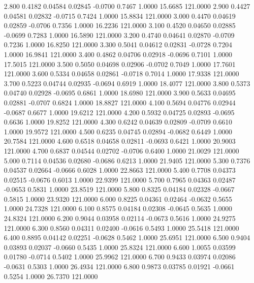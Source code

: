    2.800   0.4182   0.04584   0.02845  -0.0700   0.7467   1.0000  15.6685 121.0000
   2.900   0.4427   0.04581   0.02832  -0.0715   0.7424   1.0000  15.8834 121.0000
   3.000   0.4470   0.04619   0.02859  -0.0706   0.7356   1.0000  16.2236 121.0000
   3.100   0.4520   0.04650   0.02885  -0.0699   0.7283   1.0000  16.5890 121.0000
   3.200   0.4740   0.04641   0.02870  -0.0709   0.7236   1.0000  16.8250 121.0000
   3.300   0.5041   0.04612   0.02831  -0.0728   0.7204   1.0000  16.9841 121.0000
   3.400   0.4862   0.04706   0.02918  -0.0696   0.7101   1.0000  17.5015 121.0000
   3.500   0.5050   0.04698   0.02906  -0.0702   0.7049   1.0000  17.7601 121.0000
   3.600   0.5334   0.04658   0.02861  -0.0718   0.7014   1.0000  17.9338 121.0000
   3.700   0.5223   0.04744   0.02935  -0.0694   0.6919   1.0000  18.4077 121.0000
   3.800   0.5373   0.04740   0.02928  -0.0695   0.6861   1.0000  18.6980 121.0000
   3.900   0.5633   0.04695   0.02881  -0.0707   0.6824   1.0000  18.8827 121.0000
   4.100   0.5694   0.04776   0.02944  -0.0687   0.6677   1.0000  19.6212 121.0000
   4.200   0.5932   0.04725   0.02893  -0.0695   0.6636   1.0000  19.8252 121.0000
   4.300   0.6242   0.04639   0.02809  -0.0709   0.6610   1.0000  19.9572 121.0000
   4.500   0.6235   0.04745   0.02894  -0.0682   0.6449   1.0000  20.7584 121.0000
   4.600   0.6518   0.04658   0.02811  -0.0693   0.6421   1.0000  20.9003 121.0000
   4.700   0.6837   0.04544   0.02702  -0.0706   0.6400   1.0000  21.0029 121.0000
   5.000   0.7114   0.04536   0.02680  -0.0686   0.6213   1.0000  21.9405 121.0000
   5.300   0.7376   0.04537   0.02664  -0.0666   0.6028   1.0000  22.8663 121.0000
   5.400   0.7708   0.04373   0.02515  -0.0676   0.6013   1.0000  22.9399 121.0000
   5.700   0.7965   0.04363   0.02487  -0.0653   0.5831   1.0000  23.8519 121.0000
   5.800   0.8325   0.04184   0.02328  -0.0667   0.5815   1.0000  23.9320 121.0000
   6.000   0.8225   0.04361   0.02464  -0.0632   0.5655   1.0000  24.7328 121.0000
   6.100   0.8575   0.04184   0.02308  -0.0645   0.5635   1.0000  24.8324 121.0000
   6.200   0.9044   0.03958   0.02114  -0.0673   0.5616   1.0000  24.9275 121.0000
   6.300   0.8560   0.04311   0.02400  -0.0616   0.5493   1.0000  25.5418 121.0000
   6.400   0.8895   0.04142   0.02251  -0.0628   0.5462   1.0000  25.6951 121.0000
   6.500   0.9404   0.03893   0.02037  -0.0660   0.5435   1.0000  25.8324 121.0000
   6.600   1.0055   0.03599   0.01780  -0.0714   0.5402   1.0000  25.9962 121.0000
   6.700   0.9433   0.03974   0.02086  -0.0631   0.5303   1.0000  26.4934 121.0000
   6.800   0.9873   0.03785   0.01921  -0.0661   0.5254   1.0000  26.7370 121.0000
